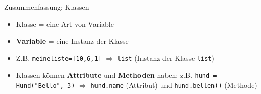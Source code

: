 \begin{frame}[fragile]{Zusammenfassung: Klassen}
	\begin{itemize}[<+->]
		\item Klasse = eine Art von Variable
		\item \textbf{Variable} = eine Instanz der Klasse
		\item Z.B. \lstinline|meineliste=[10,6,1]| $\Rightarrow$ \lstinline|list| (Instanz der Klasse \lstinline|list|)
		\item Klassen können \textbf{Attribute} und \textbf{Methoden} haben: z.B. \lstinline|hund = Hund("Bello", 3)| $\Rightarrow$ \lstinline|hund.name| (Attribut) und \lstinline|hund.bellen()| (Methode)
	\end{itemize}
\end{frame}